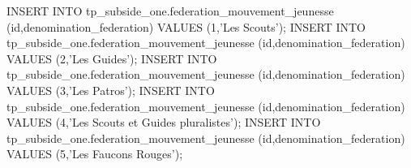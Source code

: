 
INSERT INTO tp_subside_one.federation_mouvement_jeunesse (id,denomination_federation)
	VALUES (1,'Les Scouts');
INSERT INTO tp_subside_one.federation_mouvement_jeunesse (id,denomination_federation)
	VALUES (2,'Les Guides');
INSERT INTO tp_subside_one.federation_mouvement_jeunesse (id,denomination_federation)
	VALUES (3,'Les Patros');
INSERT INTO tp_subside_one.federation_mouvement_jeunesse (id,denomination_federation)
	VALUES (4,'Les Scouts et Guides pluralistes');
INSERT INTO tp_subside_one.federation_mouvement_jeunesse (id,denomination_federation)
	VALUES (5,'Les Faucons Rouges');
	
	
